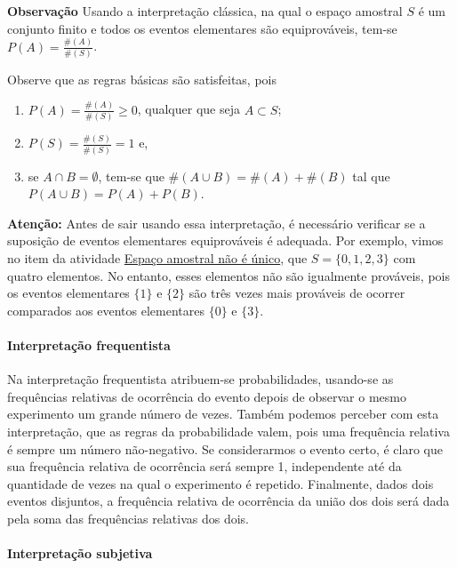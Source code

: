 \begin{observation}{ }

\textbf{Observação} Usando a interpretação clássica, na qual o espaço amostral \(S\) é um conjunto finito e todos os eventos elementares são equiprováveis, tem-se \(P(A)=\frac{\#(A)}{\#(S)}\).

Observe que as regras básicas são satisfeitas, pois
\begin{enumerate}
\item {} 
\(P(A)=\displaystyle{\frac{\#(A)}{\#(S)}}\geq 0\), qualquer que seja \(A \subset S\);

\item {} 
\(P(S)=\displaystyle{\frac{\#(S)}{\#(S)}=1}\) e,

\item {} 
se \(A\cap B=\emptyset\), tem-se que \(\#(A\cup B)=\#(A)+\#(B)\) tal que \(P(A\cup B)=P(A)+P(B)\).

\end{enumerate}

\textbf{Atenção:} Antes de sair usando essa interpretação, é necessário verificar se a suposição de eventos elementares equiprováveis é adequada. Por exemplo, vimos no item  da atividade \hyperref[espaço-nao-unico]{Espaço amostral não é único}, que \(S=\{0,1,2,3\}\) com quatro elementos. No entanto, esses elementos não são igualmente prováveis, pois os eventos elementares \(\{1\}\) e \(\{ 2\}\) são três vezes mais prováveis de ocorrer comparados aos eventos elementares \(\{0\}\) e \(\{3\}\).
\end{observation}

\paragraph{Interpretação frequentista}

Na interpretação frequentista atribuem-se probabilidades, usando-se as frequências relativas de ocorrência do evento depois de observar o mesmo experimento um grande número de vezes. Também podemos perceber com esta interpretação, que as regras da probabilidade valem, pois uma frequência relativa é sempre um número não-negativo. Se considerarmos o evento certo, é claro que sua frequência relativa de ocorrência será sempre 1, independente até da quantidade de vezes na qual o experimento é repetido. Finalmente, dados dois eventos disjuntos, a frequência relativa de ocorrência da união dos dois será dada pela soma das frequências relativas dos dois.

\paragraph{Interpretação subjetiva}

